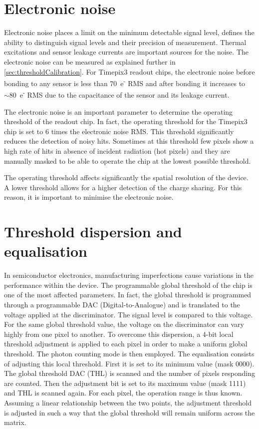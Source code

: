\section{Electronic noise}\label{sec:noise}

Electronic noise places a limit on the minimum detectable signal
level, defines the ability to distinguish signal levels and their
precision of measurement. Thermal excitations and sensor leakage
currents are important sources for the noise. The electronic noise can
be measured as explained further in
\cref{sec:thresholdCalibration}. For Timepix3 readout chips, the
electronic noise before bonding to any sensor is less than
70~e\textsuperscript{-} RMS and after bonding it increases to
$\sim80$~e\textsuperscript{-} RMS due to the capacitance of the sensor
and its leakage current.

The electronic noise is an important parameter to determine the
operating threshold of the readout chip. In fact, the operating
threshold for the Timepix3 chip is set to 6 times the electronic noise
RMS. This threshold significantly reduces the detection of noisy
hits. Sometimes at this threshold few pixels show a high rate of hits
in absence of incident radiation (hot pixels) and they are manually
masked to be able to operate the chip at the lowest possible
threshold.

The operating threshold affects significantly the spatial resolution
of the device. A lower threshold allows for a higher detection of the
charge sharing. For this reason, it is important to minimise the
electronic noise.

\section{Threshold dispersion and equalisation} 
\label{sec:ThresholdEqualisation}


In semiconductor electronics, manufacturing imperfections cause
variations in the performance within the device. The programmable
global threshold of the chip is one of the most affected
parameters. In fact, the global threshold is programmed through a
programmable DAC (Digital-to-Analogue) and is translated to the voltage
applied at the discriminator. The signal level is compared to this
voltage. For the same global threshold value, the voltage on the
discriminator can vary highly from one pixel to another. To overcome
this dispersion, a 4-bit local threshold adjustment is applied to each
pixel in order to make a uniform global threshold. The photon counting
mode is then employed. The equalisation consists of adjusting this
local threshold. First it is set to its minimum value (mask 0000). The
global threshold DAC (THL) is scanned and the number of pixels
responding are counted. Then the adjustment bit is set to its maximum
value (mask 1111) and THL is scanned again. For each pixel, the
operation range is thus known. Assuming a linear relationship between
the two points, the adjustment threshold is adjusted in such a way
that the global threshold will remain uniform across the matrix.

